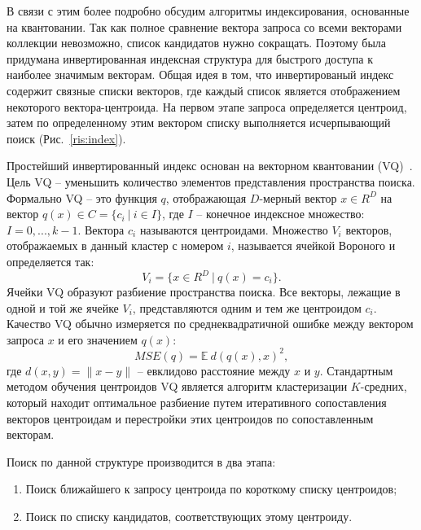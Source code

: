 В связи с этим более подробно обсудим алгоритмы индексирования, основанные на квантовании. Так как полное сравнение вектора запроса со всеми векторами коллекции невозможно, список кандидатов нужно сокращать. Поэтому была придумана инвертированная индексная структура для быстрого доступа к наиболее значимым векторам. Общая идея в том, что инвертированый индекс содержит связные списки векторов, где каждый список является отображением некоторого вектора-центроида. На первом этапе запроса определяется центроид, затем по определенному этим вектором списку выполняется исчерпывающий поиск (Рис.~\ref{ris:index}).

Простейший инвертированный индекс основан на векторном квантовании (VQ)~\cite{1,2,7}. Цель VQ -- уменьшить количество элементов представления пространства поиска. Формально VQ -- это функция $q$, отображающая $D$-мерный вектор $x\in R^D$ на вектор $q(x)\in C = \{c_i~|~i\in I\}$, где $I$ -- конечное индексное множество: $I = 0 , ... , k-1$. Вектора $c_i$ называются центроидами. Множество $V_i$ векторов, отображаемых в данный кластер с номером $i$, называется ячейкой Вороного и определяется так:
$$V_i = \{x\in R^D~|~q(x)=c_i\}.$$
Ячейки VQ образуют разбиение пространства поиска. Все векторы, лежащие в одной и той же ячейке $V_i$, представляются одним и тем же центроидом $c_i$. Качество VQ обычно измеряется по среднеквадратичной ошибке между вектором запроса $x$ и его значением $q(x)$:
$$MSE(q) = \mathbb{E}~d(q(x), x)^2,$$
где $d(x, y) = \| x - y \|$ -- евклидово расстояние между $x$ и $y$.
Стандартным методом обучения центроидов VQ является алгоритм кластеризации $K$-средних, который находит оптимальное разбиение путем итеративного сопоставления векторов центроидам и перестройки этих центроидов по сопоставленным векторам.

Поиск по данной структуре производится в два этапа:
\begin{enumerate}
\item Поиск ближайшего к запросу центроида по короткому списку центроидов;
\item Поиск по списку кандидатов, соответствующих этому центроиду.
\end{enumerate}


